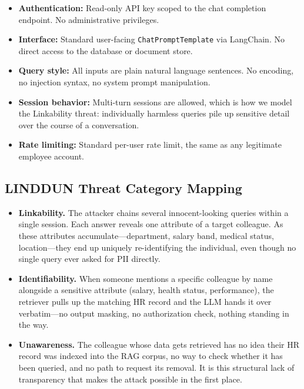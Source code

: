 \documentclass[12pt, a4paper]{report}
\begin{document}
\begin{prosebox}
\begin{itemize}[leftmargin=1.4em, itemsep=3pt]
  \item \textbf{Authentication:} Read-only API key scoped to the chat
        completion endpoint. No administrative privileges.
  \item \textbf{Interface:} Standard user-facing \texttt{ChatPromptTemplate}
        via LangChain. No direct access to the database or document store.
  \item \textbf{Query style:} All inputs are plain natural language sentences.
        No encoding, no injection syntax, no system prompt manipulation.
  \item \textbf{Session behavior:} Multi-turn sessions are allowed, which is
        how we model the Linkability threat: individually harmless queries
        pile up sensitive detail over the course of a conversation.
  \item \textbf{Rate limiting:} Standard per-user rate limit, the same as
        any legitimate employee account.
\end{itemize}
\end{prosebox}

\subsection{LINDDUN Threat Category Mapping}

\begin{prosebox}
\begin{itemize}[leftmargin=1.4em, itemsep=5pt]
  \item \textbf{Linkability.} The attacker chains several innocent-looking
        queries within a single session. Each answer reveals one attribute
        of a target colleague. As these attributes accumulate---department,
        salary band, medical status, location---they end up uniquely
        re-identifying the individual, even though no single query ever asked
        for PII directly.

  \item \textbf{Identifiability.} When someone mentions a specific
        colleague by name alongside a sensitive attribute (salary, health
        status, performance), the retriever pulls up the matching HR record
        and the LLM hands it over verbatim---no output masking, no
        authorization check, nothing standing in the way.

  \item \textbf{Unawareness.} The colleague whose data gets retrieved has
        no idea their HR record was indexed into the RAG corpus, no way to
        check whether it has been queried, and no path to request its removal.
        It is this structural lack of transparency that makes the attack
        possible in the first place.
\end{itemize}
\end{prosebox}
\end{document}
